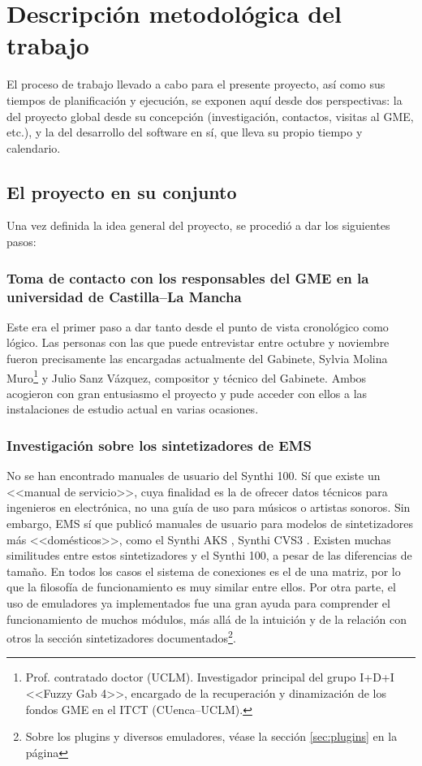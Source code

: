 \chapter[Metodología]{Descripción metodológica del trabajo}

El proceso de trabajo llevado a cabo para el presente proyecto, así como sus tiempos de planificación y ejecución, se exponen aquí desde dos perspectivas: la del proyecto global desde su concepción (investigación, contactos, visitas al GME, etc.), y la del desarrollo del software en sí, que lleva su propio tiempo y calendario. 

\section[El proyecto en su conjunto]{El proyecto en su conjunto }


Una vez definida la idea general del proyecto, se procedió a dar los siguientes pasos:

\subsection{Toma de contacto con los responsables del GME en la universidad de Castilla--La Mancha }

Este era el primer paso a dar tanto desde el punto de vista cronológico como lógico. Las personas con las que puede entrevistar entre octubre y noviembre fueron precisamente las encargadas actualmente del Gabinete, Sylvia Molina Muro\footnote{Prof. contratado doctor (UCLM). Investigador principal del grupo I+D+I <<Fuzzy Gab 4>>, encargado de la recuperación y dinamización de los fondos GME en el ITCT (CUenca--UCLM).} y Julio Sanz Vázquez, compositor y técnico del Gabinete. Ambos acogieron con gran entusiasmo el proyecto y pude acceder con ellos a las instalaciones de estudio actual en varias ocasiones.

\subsection{Investigación sobre los sintetizadores de EMS}

No se han encontrado manuales de usuario del Synthi 100. Sí que existe un <<manual de servicio>>, cuya finalidad es la de ofrecer datos técnicos para ingenieros en electrónica, no una guía de uso para músicos o artistas sonoros. Sin embargo, EMS sí que publicó manuales de usuario para modelos de sintetizadores más <<domésticos>>, como el Synthi AKS \citeyear{SynthiAKS_brochure}, Synthi CVS3 \citeyear{SynthiVCS3_brochure}. Existen muchas similitudes entre estos sintetizadores y el Synthi 100, a pesar de las diferencias de tamaño. En todos los casos el sistema de conexiones es el de una matriz, por lo que la filosofía de funcionamiento es muy similar entre ellos. Por otra parte, el uso de emuladores ya implementados fue una gran ayuda para comprender el funcionamiento de muchos módulos, más allá de la intuición y de la relación con otros la sección sintetizadores documentados\footnote{Sobre los plugins y diversos emuladores, véase la sección \ref*{sec:plugins} en la página \pageref{sec:plugins}}.

